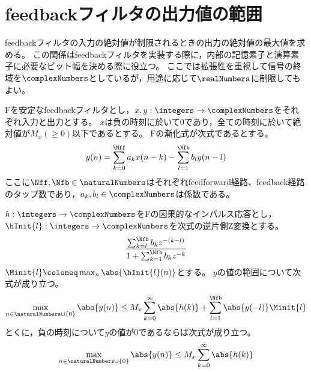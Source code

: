 \section{feedbackフィルタの出力値の範囲}
    feedbackフィルタの入力の絶対値が制限されるときの出力の絶対値の最大値を求める。
    この関係はfeedbackフィルタを実装する際に，内部の記憶素子と演算素子に必要なビット幅を決める際に役立つ。
    ここでは拡張性を重視して信号の終域を$\complexNumbers$としているが，用途に応じて$\realNumbers$に制限してもよい。
    \begin{shadebox}
        Fを安定なfeedbackフィルタとし，$x,y:\integers\to\complexNumbers$をそれぞれ入力と出力とする。
        $x$は負の時刻に於いて0であり，全ての時刻に於いて絶対値が$M_x(\geq 0)$以下であるとする。
        Fの漸化式が次式であるとする。
        \[ y(n) = \sum_{k=0}^\Nff a_k x(n-k) - \sum_{l=1}^\Nfb b_l y(n-l) \]
        ここに$\Nff,\Nfb\in\naturalNumbers$はそれぞれfeedforward経路、feedback経路のタップ数であり，$a_k,b_l\in\complexNumbers$は係数である。
        \par
        $h:\integers\to\complexNumbers$をFの因果的なインパルス応答とし，$\hInit{l}:\integers\to\complexNumbers$を次式の逆片側Z変換とする。
        \[ \frac{\sum_{k=l}^\Nfb b_{k} z^{-(k-l)}}{1+\sum_{k=1}^\Nfb b_k z^{-k}} \]
        $\Minit{l}\coloneq\max_n {\abs{\hInit{l}(n)}}$とする。
        $y$の値の範囲について次式が成り立つ。
        \[ \max_{n\in\naturalNumbers\cup\{0\}}\abs{y(n)} \leq M_x\sum_{k=0}^\infty\abs{h(k)} + \sum_{l=1}^\Nfb\abs{y(-l)}\Minit{l} \]
        とくに，負の時刻について$y$の値が0であるならば次式が成り立つ。
        \[ \max_{n\in\naturalNumbers\cup\{0\}}\abs{y(n)} \leq M_x\sum_{k=0}^\infty\abs{h(k)} \]
    \end{shadebox}
